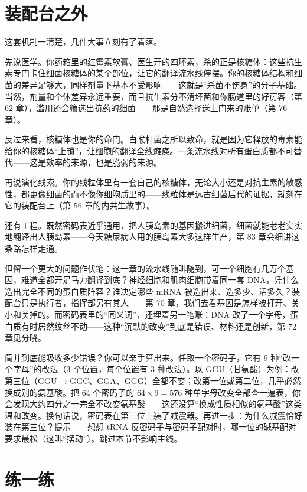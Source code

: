 \section{装配台之外}

这套机制一清楚，几件大事立刻有了着落。

先说医学。你药箱里的红霉素软膏、医生开的四环素，杀的正是核糖体：这些抗生素专门卡住细菌核糖体的某个部位，让它的翻译流水线停摆。你的核糖体结构和细菌的差异足够大，同样剂量下基本不受影响——这就是“杀菌不伤身”的分子基础。当然，剂量和个体差异永远重要，而且抗生素分不清坏菌和你肠道里的好房客（第 62 章），滥用还会筛选出抗药的细菌——那是自然选择送上门来的账单（第 76 章）。

反过来看，核糖体也是你的命门。白喉杆菌之所以致命，就是因为它释放的毒素能给你的核糖体“上锁”，让细胞的翻译全线瘫痪。一条流水线对所有蛋白质都不可替代——这是效率的来源，也是脆弱的来源。

再说演化线索。你的线粒体里有一套自己的核糖体，无论大小还是对抗生素的敏感性，都更像细菌的而不像你细胞质里的——线粒体是远古细菌后代的证据，就刻在它的装配台上（第 56 章的内共生故事）。

还有工程。既然密码表近乎通用，把人胰岛素的基因搬进细菌，细菌就能老老实实地翻译出人胰岛素——今天糖尿病人用的胰岛素大多这样生产，第 83 章会细讲这条路怎样走通。

但留一个更大的问题作伏笔：这一章的流水线随叫随到，可一个细胞有几万个基因，难道全都开足马力翻译到底？神经细胞和肌肉细胞带着同一套 DNA，凭什么造出完全不同的蛋白质阵容？谁决定哪些 mRNA 被造出来、造多少、活多久？装配台只是执行者，指挥部另有其人——第 70 章，我们去看基因是怎样被打开、关小和关掉的。而密码表里的“同义词”，还埋着另一笔账：DNA 改了一个字母，蛋白质有时居然纹丝不动——这种“沉默的改变”到底是错误、材料还是创新，第 72 章见分晓。

\begin{tiaozhan}
简并到底能吸收多少错误？你可以亲手算出来。任取一个密码子，它有 9 种“改一个字母”的改法（3 个位置，每个位置有 3 种改法）。以 GGU（甘氨酸）为例：改第三位（GGU$\rightarrow$GGC、GGA、GGG）全都不变；改第一位或第二位，几乎必然换成别的氨基酸。把 64 个密码子的 $64\times 9=576$ 种单字母改变全部查一遍表，你会发现大约四分之一完全不改变氨基酸——这还没算“换成性质相似的氨基酸”这类温和改变。换句话说，密码表在第三位上装了减震器。再进一步：为什么减震恰好装在第三位？提示——想想 tRNA 反密码子与密码子配对时，哪一位的碱基配对要求最松（这叫“摆动”）。跳过本节不影响主线。
\end{tiaozhan}

\section*{练一练}


